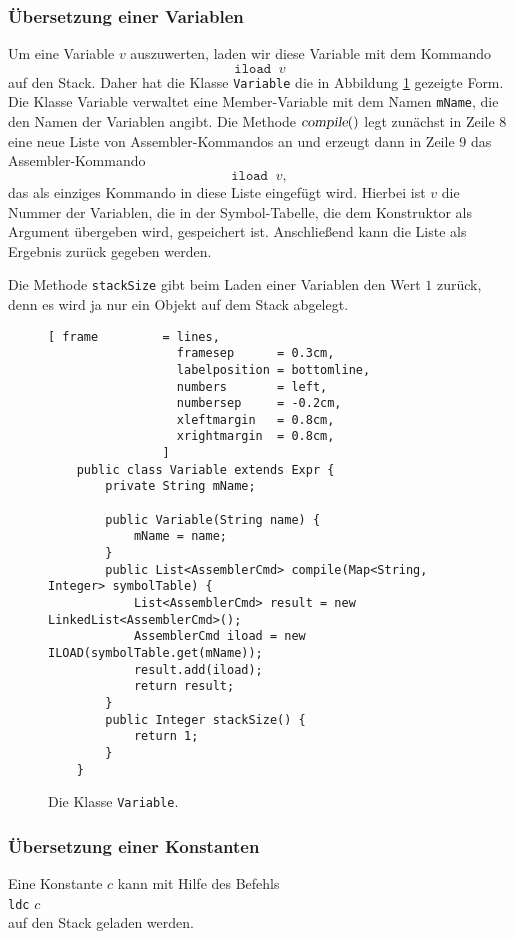 \subsubsection{\"Ubersetzung einer Variablen}
Um eine Variable $v$ auszuwerten, laden wir diese Variable mit dem Kommando 
\[  \texttt{iload}\;\; v  \]
auf den Stack.  Daher hat die Klasse \texttt{Variable} die in Abbildung \ref{fig:Expr:Variable.java}
gezeigte Form.  Die Klasse Variable verwaltet eine Member-Variable mit dem Namen
\texttt{mName}, die den Namen der Variablen angibt.  Die Methode $\textsl{compile}()$ legt
zun\"achst in Zeile 8 eine neue Liste von Assembler-Kommandos an und erzeugt dann in Zeile
9 das Assembler-Kommando
\[ \texttt{iload}\;\;v, \]
das als einziges Kommando in diese Liste eingef\"ugt wird.  Hierbei ist $v$ die Nummer der Variablen,
die in der Symbol-Tabelle, die dem Konstruktor als Argument \"ubergeben wird, gespeichert ist.
Anschlie{\ss}end kann die Liste als Ergebnis zur\"uck gegeben werden.

Die Methode \texttt{stackSize} gibt beim Laden einer Variablen  den Wert $1$ zur\"uck, denn es
wird ja nur ein Objekt auf dem Stack abgelegt.

\begin{figure}[!ht]
\centering
\begin{Verbatim}[ frame         = lines, 
                  framesep      = 0.3cm, 
                  labelposition = bottomline,
                  numbers       = left,
                  numbersep     = -0.2cm,
                  xleftmargin   = 0.8cm,
                  xrightmargin  = 0.8cm,
                ]
    public class Variable extends Expr {
        private String mName;
    
        public Variable(String name) {
            mName = name;
        }
        public List<AssemblerCmd> compile(Map<String, Integer> symbolTable) {
            List<AssemblerCmd> result = new LinkedList<AssemblerCmd>();
            AssemblerCmd iload = new ILOAD(symbolTable.get(mName));
            result.add(iload);
            return result;
        }
        public Integer stackSize() {
            return 1;
        }
    }
\end{Verbatim}
\vspace*{-0.3cm}
\caption{Die Klasse \texttt{Variable}.}
\label{fig:Expr:Variable.java}
\end{figure}

\subsubsection{\"Ubersetzung einer Konstanten}
Eine Konstante $c$ kann mit Hilfe des Befehls
\\[0.2cm]
\hspace*{1.3cm}
\texttt{ldc} $c$
\\[0.2cm]
auf den Stack geladen werden.



